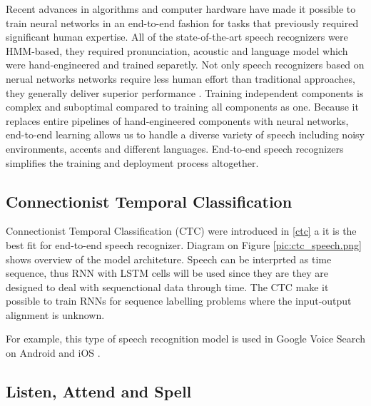 Recent advances in algorithms and computer hardware have made it possible to train neural networks in an end-to-end fashion for tasks that previously required significant human expertise.
All of the state-of-the-art speech recognizers were HMM-based, they required pronunciation, acoustic and language model which were hand-engineered and trained separetly.
Not only speech recognizers based on nerual networks networks require less human effort than traditional approaches, they generally deliver superior performance \cite{end-to-end}.
Training independent components is complex and suboptimal compared to training all components as one.
Because it replaces entire pipelines of hand-engineered components with neural networks, end-to-end learning allows us to handle a diverse variety of speech including noisy environments, accents and different languages\cite{end-to-end-mandarin}.
End-to-end speech recognizers simplifies the training and deployment process altogether.

\subsection{Connectionist Temporal Classification}

Connectionist Temporal Classification (CTC) were introduced in \ref{ctc} a it is the best fit for end-to-end speech recognizer.
Diagram on Figure \ref{pic:ctc_speech.png} shows overview of the model architeture.
Speech can be interprted as time sequence, thus RNN with LSTM cells will be used since they are they are designed to deal with sequenctional data through time.
The CTC make it possible to train RNNs for sequence labelling problems where the input-output alignment is unknown.


For example, this type of speech recognition model is used in Google Voice Search on Android and iOS \cite{google_search}.


\subsection{Listen, Attend and Spell}

